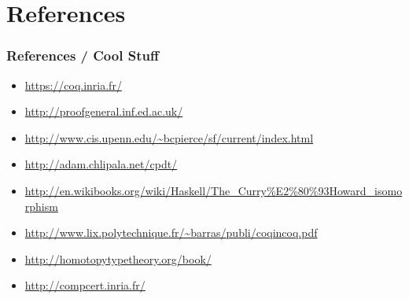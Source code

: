 \documentclass{beamer}
\begin{document}
\section{References}

\begin{frame}
  \frametitle{References / Cool Stuff}
  \begin{itemize}
  \item \url{https://coq.inria.fr/}
  \item \url{http://proofgeneral.inf.ed.ac.uk/}
  \item \url{http://www.cis.upenn.edu/~bcpierce/sf/current/index.html}
  \item \url{http://adam.chlipala.net/cpdt/}
  \item \url{http://en.wikibooks.org/wiki/Haskell/The_Curry\%E2\%80\%93Howard_isomorphism}
  \item \url{http://www.lix.polytechnique.fr/~barras/publi/coqincoq.pdf}
  \item \url{http://homotopytypetheory.org/book/}
  \item \url{http://compcert.inria.fr/}
  \end{itemize}
\end{frame}
\end{document}
